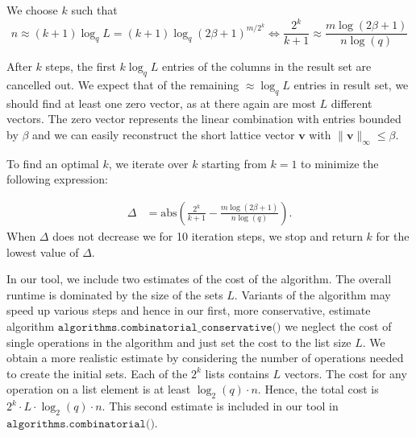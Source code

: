 We choose $k$ such that
\begin{equation}
  n \approx (k+1) \log_q L = (k+1) \log_q (2\beta+1)^{m/2^k} \iff \frac{2^k}{k+1} \approx \frac{m \log(2\beta + 1)}{n \log(q)}
\end{equation}

After $k$ steps, the first $k \log_q L$ entries of the columns in the result set are cancelled out. We expect that of the remaining $\approx \log_q L$ entries in result set, we should find at least one zero vector, as at there again are most $L$ different vectors. The zero vector represents the linear combination with entries bounded by $\beta$ and we can easily reconstruct the short lattice vector $\mathbf{v}$ with $\|\mathbf{v}\|_\infty \leq \beta$.

To find an optimal $k$, we iterate over $k$ starting from $k=1$ to minimize the following expression:

\begin{align}
  \Delta & = \text{abs}\left(\frac{2^k}{k+1} - \frac{m \log(2\beta + 1)}{n \log(q)}\right).
\end{align}
When $\Delta$ does not decrease we for 10 iteration steps, we stop and return $k$ for the lowest value of $\Delta$.

In our tool, we include two estimates of the cost of the algorithm. The overall runtime is dominated by the size of the sets $L$. Variants of the algorithm may speed up various steps and hence in our first, more conservative, estimate algorithm $\texttt{algorithms.combinatorial\_conservative()}$ we neglect the cost of single operations in the algorithm and just set the cost to the list size $L$. We obtain a more realistic estimate by considering the number of operations needed to create the initial sets. Each of the $2^k$ lists contains $L$ vectors. The cost for any operation on a list element is at least $\log_2(q) \cdot n$. Hence, the total cost is $2^k \cdot L \cdot \log_2(q) \cdot n$. This second estimate is included in our tool in $\texttt{algorithms.combinatorial()}$. %



